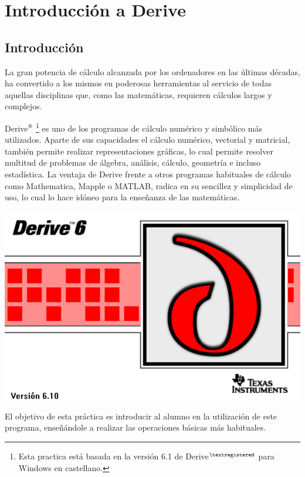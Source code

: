 \chapter{Introducción a Derive}

\section{Introducción}
La gran potencia de cálculo alcanzada por los ordenadores en las
últimas décadas, ha convertido a los mismos en poderosas
herramientas al servicio de todas aquellas disciplinas que, como las
matemáticas, requieren cálculos largos y complejos.

Derive$^{\textsf{\textregistered}}$
\renewcommand{\thefootnote}{\fnsymbol{footnote}}\footnote{Esta
practica está basada en la versión 6.1 de
Derive$^{\textregistered}$ para Windows en castellano.} es uno de
los programas de cálculo numérico y simbólico más utilizados.
Aparte de sus capacidades el cálculo numérico, vectorial y
matricial, también permite realizar representaciones gráficas, lo
cual permite resolver multitud de problemas de álgebra, análisis,
cálculo, geometría e incluso estadística. La ventaja de Derive
frente a otros programas habituales de cálculo como Mathematica,
Mapple o MATLAB, radica en su sencillez y simplicidad de uso, lo
cual lo hace idóneo para la enseñanza de las matemáticas.

\begin{center}
\includegraphics[scale=0.6]{img/introduccion_derive/introduccion}
\end{center}


El objetivo de esta práctica es introducir al alumno en la
utilización de este programa, enseñándole a realizar las operaciones
básicas más habituales.



